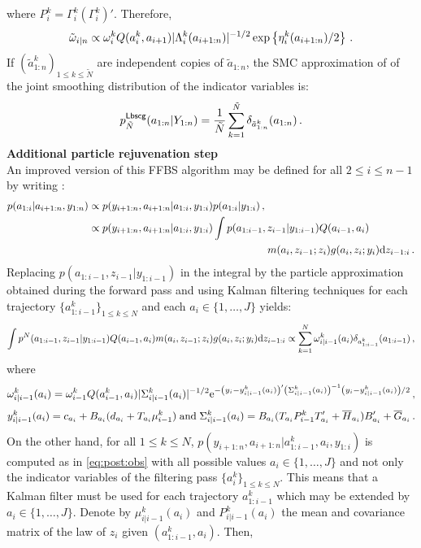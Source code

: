 where $P_i^k = \Gamma_i^k(\Gamma_i^k)'$. Therefore,
\[
\tilde{\omega}_{i|n} \propto \omega_i^kQ(a_i^k,a_{i+1})|\Lambda^k_i(a_{i+1:n})|^{-1/2}\exp\left\{\eta^k_i(a_{i+1:n})/2\right\}\,.
\]
If $(\tilde{a}^k_{1:n})_{1\le k \le \tilde{N}}$ are independent copies of $\tilde{a}_{1:n}$, the SMC approximation of \cite{lindsten:bunch:sarkka:schon:godsill:2015} of the joint smoothing distribution of the indicator variables is:
\[
p^{\mathsf{Lbscg}}_{\tilde{N}}(a_{1:n}|Y_{1:n}) = \frac{1}{\tilde{N}}\sum_{k=1}^{\tilde N} \delta_{\tilde{a}^{k}_{1:n}}(a_{1:n})\,.
\]
\textbf{Additional particle rejuvenation step}\\
An improved version of this FFBS algorithm may be defined for all $2\le i\le n-1$ by writing :
\begin{align*}
p(a_{1:i}|a_{i+1:n},y_{1:n}) &\propto p(y_{i+1:n},a_{i+1:n}|a_{1:i},y_{1:i})p(a_{1:i}|y_{1:i})\eqsp,\\
&\propto p(y_{i+1:n},a_{i+1:n}|a_{1:i},y_{1:i})\int p(a_{1:i-1},z_{i-1}|y_{1:i-1})Q(a_{i-1},a_i)\\
&\hspace{6cm}m(a_i,z_{i-1};z_i)g(a_i,z_i;y_i)\rmd z_{i-1:i}\eqsp.
\end{align*}
Replacing $p(a_{1:i-1},z_{i-1}|y_{1:i-1})$ in the integral by the particle approximation obtained during the forward pass and using Kalman filtering techniques for each trajectory $\{a^k_{1:i-1}\}_{1\le k\le N}$ and each $a_i\in\{1,\ldots,J\}$ yields:
\[
\int p^N(a_{1:i-1},z_{i-1}|y_{1:i-1})Q(a_{i-1},a_i)m(a_i,z_{i-1};z_i)g(a_i,z_i;y_i)\mathrm{d} z_{i-1:i} \propto \sum_{k=1}^N \omega_{i|i-1}^k(a_i)\delta_{a^k_{1:i-1}}(a_{1:i-1})\,,
\]
where
\[
\omega_{i|i-1}^k(a_i) = \omega_{i-1}^k Q(a_{i-1}^k,a_i)|\Sigma^k_{i|i-1}(a_i)|^{-1/2}\mathrm{e}^{-\left(y_i - y^k_{i|i-1}(a_i)\right)'\left(\Sigma^k_{i|i-1}(a_i)\right)^{-1}\left(y_i - y^k_{i|i-1}(a_i)\right)/2}\,,
\]
\[
y^k_{i|i-1}(a_i) = c_{a_i} + B_{a_i}(d_{a_i}+T_{a_i}\mu^k_{i-1})\;\mbox{and}\; \Sigma^k_{i|i-1}(a_i) = B_{a_i}(T_{a_i}P^k_{i-1}T'_{a_i}+\overline{H}_{a_i})B'_{a_i} + \overline{G}_{a_i}\,.
\]
On the other hand, for all $1\le k \le N$, $p(y_{i+1:n},a_{i+1:n}|a^k_{1:i-1},a_i,y_{1:i})$ is computed as in \eqref{eq:post:obs} with all possible values $a_i\in\{1,\ldots,J\}$ and not only the indicator variables of the filtering pass $\{a_i^k\}_{1\le k \le N}$. This means that a Kalman filter must be used for each trajectory $a^k_{1:i-1}$ which may be extended by $a_i\in\{1,\ldots,J\}$. Denote by $\mu_{i|i-1}^k(a_i)$ and $P_{i|i-1}^k(a_i)$ the mean and covariance matrix of the law of $z_i$ given $(a^k_{1:i-1},a_i)$. Then,
